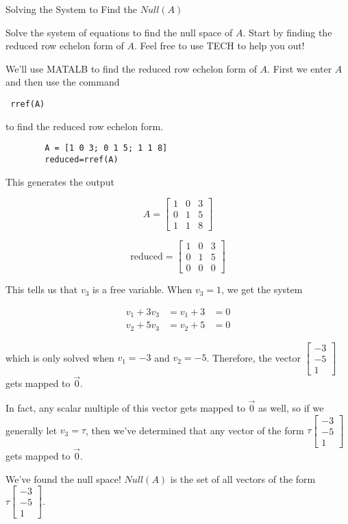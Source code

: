 \documentclass{ximera}
\begin{document}
\begin{problem}{Solving the System to Find the $Null(A)$}

Solve the system of equations to find the null space of $A$. Start by finding the reduced row echelon form of $A$. Feel free to use TECH to help you out!

\begin{solution}
    We'll use MATALB to find the reduced row echelon form of $A$. First we enter $A$ and then use the command \begin{verbatim} rref(A) \end{verbatim} to find the reduced row echelon form.

    \begin{verbatim}
        A = [1 0 3; 0 1 5; 1 1 8]
        reduced=rref(A)
    \end{verbatim}

    This generates the output

    $$A=\begin{bmatrix} 1 & 0 & 3 \\ 0 & 1 & 5 \\ 1 & 1 & 8 \end{bmatrix}$$

    $$\text{reduced}=\begin{bmatrix} 1 & 0 & 3 \\ 0 & 1 & 5 \\ 0 & 0 & 0 \end{bmatrix}$$

\end{solution}

This tells us that $v_3$ is a free variable. When $v_3=1$, we get the system 

\[
\begin{aligned}
    v_1 + 3v_3 &= v_1+3&=0 \\
    v_2 + 5v_3 &= v_2+5&=0
\end{aligned}
\]

which is only solved when $v_1=-3$ and $v_2=-5$. Therefore, the vector $\begin{bmatrix} -3 \\ -5 \\ 1 \end{bmatrix}$ gets mapped to $\vec{0}$.

In fact, any scalar multiple of this vector gets mapped to $\vec{0}$ as well, so if we generally let $v_3=\tau$, then we've determined that any vector of the form $\tau \begin{bmatrix} -3 \\ -5 \\ 1 \end{bmatrix}$ gets mapped to $\vec{0}$. 

We've found the null space! $Null(A)$ is the set of all vectors of the form $\tau \begin{bmatrix} -3 \\ -5 \\ 1 \end{bmatrix}$.

\end{problem}
\end{document}
